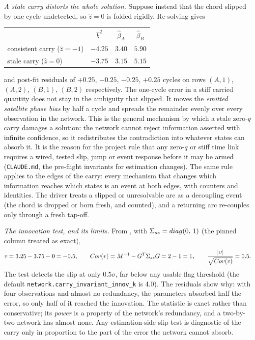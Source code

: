 \documentclass[main.tex]{subfiles}
\begin{document}
\emph{A stale carry distorts the whole solution.}  Suppose instead that
the chord slipped by one cycle undetected, so $\hat z = 0$ is folded
rigidly.  Re-solving gives
\begin{center}
\begin{tabular}{@{}lccc@{}}
\toprule
 & $\hat b^2$ & $\hat\beta_A$ & $\hat\beta_B$ \\
\midrule
consistent carry ($\hat z = -1$) & $-4.25$ & $3.40$ & $5.90$ \\
stale carry ($\hat z = 0$)       & $-3.75$ & $3.15$ & $5.15$ \\
\bottomrule
\end{tabular}
\end{center}
and post-fit residuals of $+0.25$, $-0.25$, $-0.25$, $+0.25$ cycles on
rows $(A,1)$, $(A,2)$, $(B,1)$, $(B,2)$ respectively.  The one-cycle
error in a stiff carried quantity does not stay in the ambiguity that
slipped.  It moves the \emph{emitted satellite phase bias} by half a
cycle and spreads the remainder evenly over every observation in the
network.  This is the general mechanism by which a stale zero-$q$ carry
damages a solution: the network cannot reject information asserted
with infinite confidence, so it redistributes the contradiction into
whatever states can absorb it.  It is the reason for the project rule
that any zero-$q$ or stiff time link requires a wired, tested slip,
jump or event response before it may be armed
(\texttt{CLAUDE.md}, the pre-flight invariants for estimation changes).
The same rule applies to the edges of the carry: every mechanism that
changes which information reaches which states is an event at both
edges, with counters and identities.  The driver treats a slipped or
unresolvable arc as a decoupling event (the chord is dropped or born
fresh, and counted), and a returning arc re-couples only through a
fresh tap-off.

\emph{The innovation test, and its limits.}  From
, with $\Sigma_{ss} = diag(0,\,1)$ (the pinned
column treated as exact),
\[
v = 3.25 - 3.75 - 0 = -0.5,
\qquad
Cov(v) = M^{-1} - G^{T}\Sigma_{ss}G = 2 - 1 = 1,
\qquad
\frac{|v|}{\sqrt{Cov(v)}} = 0.5 .
\]
The test detects the slip at only $0.5\sigma$, far below any usable
flag threshold (the default \texttt{network.carry\_invariant\_innov\_k}
is 4.0).  The residuals show why: with four observations and almost no
redundancy, the parameters absorbed half the error, so only half of it
reached the innovation.  The statistic is exact rather than
conservative; its \emph{power} is a property of the network's
redundancy, and a two-by-two network has almost none.  Any
estimation-side slip test is diagnostic of the carry only in proportion
to the part of the error the network cannot absorb.
\end{document}
